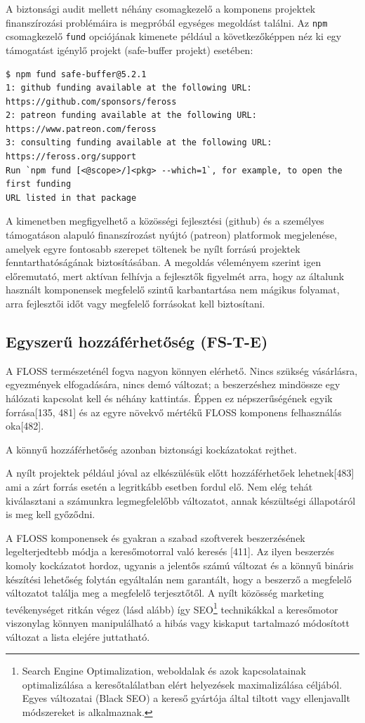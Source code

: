 \documentclass[12pt,magyar,a4paper,oneside]{scrreprt}
\begin{document}
A biztonsági audit mellett néhány csomagkezelő a komponens projektek
finanszírozási problémáira is megpróbál egységes megoldást találni. Az
\texttt{npm} csomagkezelő \texttt{fund} opciójának kimenete például a
következőképpen néz ki egy támogatást igénylő projekt (safe-buffer
projekt) esetében:

\begin{verbatim}
$ npm fund safe-buffer@5.2.1
1: github funding available at the following URL: https://github.com/sponsors/feross
2: patreon funding available at the following URL: https://www.patreon.com/feross
3: consulting funding available at the following URL: https://feross.org/support
Run `npm fund [<@scope>/]<pkg> --which=1`, for example, to open the first funding 
URL listed in that package
\end{verbatim}

A kimenetben megfigyelhető a közösségi fejlesztési (github) és a
személyes támogatáson alapuló finanszírozást nyújtó (patreon) platformok
megjelenése, amelyek egyre fontosabb szerepet töltenek be nyílt forrású
projektek fenntarthatóságának biztosításában. A megoldás véleményem
szerint igen előremutató, mert aktívan felhívja a fejlesztők figyelmét
arra, hogy az általunk használt komponensek megfelelő szintű
karbantartása nem mágikus folyamat, arra fejlesztői időt vagy megfelelő
forrásokat kell biztosítani.

\hypertarget{sec:FS-T-E}{%
\subsection{Egyszerű hozzáférhetőség (FS-T-E)}\label{sec:FS-T-E}}

A FLOSS természeténél fogva nagyon könnyen elérhető. Nincs szükség
vásárlásra, egyezmények elfogadására, nincs demó változat; a
beszerzéshez mindössze egy hálózati kapcsolat kell és néhány kattintás.
Éppen ez népszerűségének egyik forrása{[}135, 481{]} és az egyre növekvő
mértékű FLOSS komponens felhasználás oka{[}482{]}.

A könnyű hozzáférhetőség azonban biztonsági kockázatokat rejthet.

A nyílt projektek például jóval az elkészülésük előtt hozzáférhetőek
lehetnek{[}483{]} ami a zárt forrás esetén a legritkább esetben fordul
elő. Nem elég tehát kiválasztani a számunkra legmegfelelőbb változatot,
annak készültségi állapotáról is meg kell győződni.

A FLOSS komponensek és gyakran a szabad szoftverek beszerzésének
legelterjedtebb módja a keresőmotorral való keresés {[}411{]}. Az ilyen
beszerzés komoly kockázatot hordoz, ugyanis a jelentős számú változat és
a könnyű bináris készítési lehetőség folytán egyáltalán nem garantált,
hogy a beszerző a megfelelő változatot találja meg a megfelelő
terjesztőtől. A nyílt közösség marketing tevékenységet ritkán végez
(lásd alább) így SEO\footnote{Search Engine Optimalization, weboldalak
  és azok kapcsolatainak optimalizálása a keresőtalálatban elért
  helyezések maximalizálása céljából. Egyes változatai (Black SEO) a
  kereső gyártója által tiltott vagy ellenjavallt módszereket is
  alkalmaznak.} technikákkal a keresőmotor viszonylag könnyen
manipulálható a hibás vagy kiskaput tartalmazó módosított változat a
lista elejére juttatható.
\end{document}
